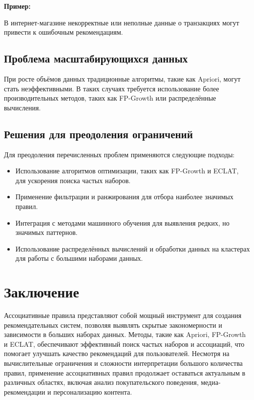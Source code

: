\textbf{Пример:}

В интернет-магазине некорректные или неполные данные о транзакциях могут привести к ошибочным рекомендациям.

\subsection{Проблема масштабирующихся данных}

При росте объёмов данных традиционные алгоритмы, такие как Apriori, могут стать неэффективными. В таких случаях требуется использование более производительных методов, таких как FP-Growth или распределённые вычисления.

\subsection{Решения для преодоления ограничений}

Для преодоления перечисленных проблем применяются следующие подходы:

\begin{itemize}
    \item Использование алгоритмов оптимизации, таких как FP-Growth и ECLAT, для ускорения поиска частых наборов.
    \item Применение фильтрации и ранжирования для отбора наиболее значимых правил.
    \item Интеграция с методами машинного обучения для выявления редких, но значимых паттернов.
    \item Использование распределённых вычислений и обработки данных на кластерах для работы с большими наборами данных.
\end{itemize}

\section{Заключение}
Ассоциативные правила представляют собой мощный инструмент для создания рекомендательных систем, позволяя выявлять скрытые закономерности и зависимости в больших наборах данных. Методы, такие как Apriori, FP-Growth и ECLAT, обеспечивают эффективный поиск частых наборов и ассоциаций, что помогает улучшать качество рекомендаций для пользователей. Несмотря на вычислительные ограничения и сложности интерпретации большого количества правил, применение ассоциативных правил продолжает оставаться актуальным в различных областях, включая анализ покупательского поведения, медиа-рекомендации и персонализацию контента.

